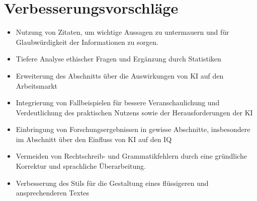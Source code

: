 \documentclass{article}
\begin{document}
\section{Verbesserungsvorschläge}

\begin{itemize}

    \item Nutzung von Zitaten, um wichtige Aussagen zu untermauern und für Glaubwürdigkeit der Informationen zu sorgen.
    \item Tiefere Analyse ethischer Fragen und Ergänzung durch Statistiken
    \item Erweiterung des Abschnitts über die Auswirkungen von KI auf den Arbeitsmarkt 
    \item Integrierung von Fallbeispielen für bessere Veranschaulichung und Verdeutlichung des praktischen Nutzens sowie der Herausforderungen der KI
    \item Einbringung von Forschungsergebnissen in gewisse Abschnitte, insbesondere im Abschnitt über den Einfluss von KI auf den IQ
    \item Vermeiden von Rechtschreib- und Grammatikfehlern durch eine gründliche Korrektur und sprachliche Überarbeitung.
    \item Verbesserung des Stils für die Gestaltung eines flüssigeren und ansprechenderen Textes
    
\end{itemize}

\printbibliography
\end{document}
